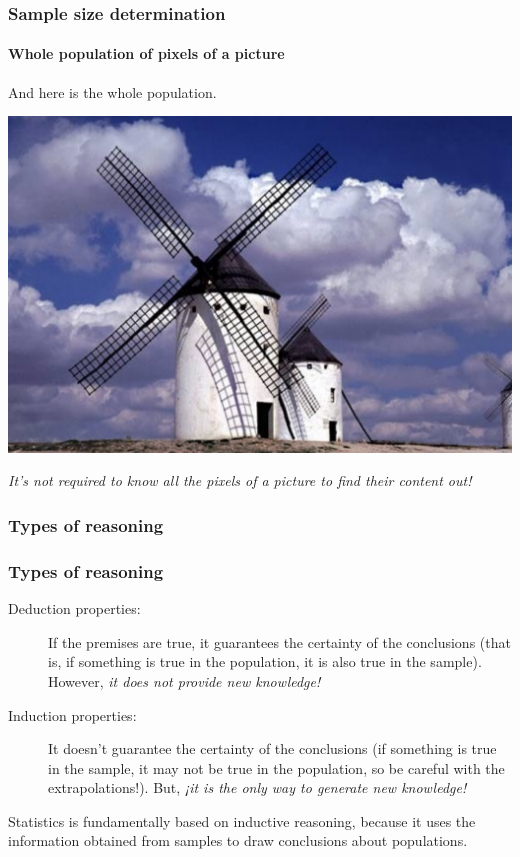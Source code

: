 \begin{frame}
\frametitle{Sample size determination}
\framesubtitle{Whole population of pixels of a picture}
\begin{center}
And here is the whole population.

\includegraphics[scale=0.45]{img/introduction/sample_windmill3.pdf}

\emph{It's not required to know all the pixels of a picture to find their content out!}
\end{center}
\end{frame}


\begin{frame}
\frametitle{Types of reasoning}

\begin{center}

\end{center}
\end{frame}


\begin{frame}
\frametitle{Types of reasoning}
\begin{description}
\item [Deduction properties:] If the premises are true, it guarantees the certainty of the conclusions (that is, if
something is true in the population, it is also true in the sample). 
However, \alert{\emph{it does not provide new knowledge!}} 
\item [Induction properties:] It doesn't guarantee the certainty of the conclusions (if something is true in the
sample, it may not be true in the population, so be careful with the extrapolations!). 
But, \alert{\emph{¡it is the only way to generate new knowledge!}}
\end{description}

Statistics is fundamentally based on inductive reasoning, because it uses the information obtained from samples to
draw conclusions about populations.
\end{frame}


